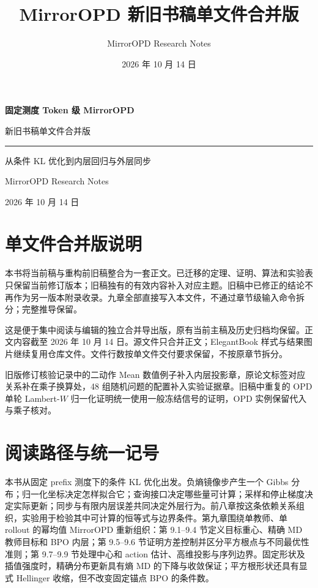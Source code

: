 \documentclass[lang=cn,scheme=chinese,openany]{../book/elegantbook}
\title{MirrorOPD 新旧书稿单文件合并版}
\author{MirrorOPD Research Notes}
\date{2026 年 10 月 14 日}
\begin{document}
\hypersetup{pageanchor=false}
\begin{titlepage}
\centering
\vspace*{35mm}
{\Huge\bfseries 固定测度 Token 级 MirrorOPD\par}
\vspace{12mm}
{\Large 新旧书稿单文件合并版\par}
\vspace{16mm}
{\color{structurecolor}\rule{0.8\textwidth}{1pt}\par}
\vspace{12mm}
{\large 从条件 KL 优化到内层回归与外层同步\par}
\vfill
{\large MirrorOPD Research Notes\par}
\vspace{5mm}
{\large 2026 年 10 月 14 日\par}
\vspace{20mm}
\end{titlepage}
\frontmatter
\hypersetup{pageanchor=true}

\chapter*{单文件合并版说明}
本书将当前稿与重构前旧稿整合为一套正文。已迁移的定理、证明、算法和实验表只保留当前修订版本；旧稿独有的有效内容补入对应主题。旧稿中已修正的结论不再作为另一版本附录收录。九章全部直接写入本文件，不通过章节级输入命令拆分；完整推导保留。

这是便于集中阅读与编辑的独立合并导出版，原有当前主稿及历史归档均保留。正文内容截至 2026 年 10 月 14 日。源文件只合并正文；ElegantBook 样式与结果图片继续复用仓库文件。文件行数按单文件交付要求保留，不按原章节拆分。

旧版修订核验记录中的二动作 Mean 数值例子补入内层投影章，原论文标签对应关系补在乘子换算处，48 组随机问题的配置补入实验证据章。旧稿中重复的 OPD 单轮 Lambert-$W$ 归一化证明统一使用一般冻结信号的证明，OPD 实例保留代入与乘子核对。


\chapter*{阅读路径与统一记号}
本书从固定 prefix 测度下的条件 KL 优化出发。负熵镜像步产生一个 Gibbs 分布；归一化坐标决定怎样拟合它；查询接口决定哪些量可计算；采样和停止梯度决定实际更新；同步与有限内层误差共同决定外层行为。前八章按这条依赖关系组织，实验用于检验其中可计算的恒等式与边界条件。第九章围绕单教师、单 rollout 的幂均值 MirrorOPD 重新组织：第 9.1--9.4 节定义目标重心、精确 MD 教师目标和 BPO 内层；第 9.5--9.6 节证明方差控制并区分平方根点与不同最优性准则；第 9.7--9.9 节处理中心和 action 估计、高维投影与序列边界。固定形状及插值强度时，精确分布更新具有熵 MD 的下降与收敛保证；平方根形状还具有显式 Hellinger 收缩，但不改变固定锚点 BPO 的条件数。
\end{document}
